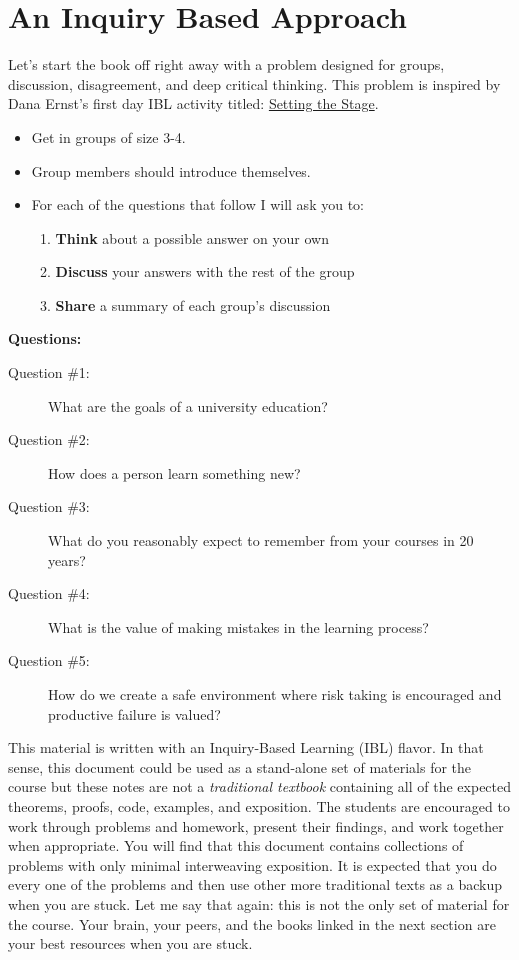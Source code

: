 \section{An Inquiry Based Approach}
\begin{problem}
    Let's start the book off right away with a problem designed for groups, discussion,
    disagreement, and deep critical thinking.  This problem is inspired by Dana Ernst's
    first day IBL activity titled: \href{http://danaernst.com/setting-the-stage/}{Setting
    the Stage}.
    \begin{itemize}
        \item Get in groups of size 3-4.
        \item Group members should introduce themselves.
        \item For each of the questions that follow I will ask you to:
            \begin{enumerate}
                \item {\bf Think} about a possible answer on your own
                \item {\bf Discuss} your answers with the rest of the group
                \item {\bf Share} a summary of each group's discussion
            \end{enumerate}
    \end{itemize}
    {\bf Questions:} 
    \begin{description}
        \item[Question \#1:] What are the goals of a university education?
        \item[Question \#2:] How does a person learn something new?
        \item[Question \#3:] What do you reasonably expect to remember from your courses
            in 20 years?
        \item[Question \#4:] What is the value of making mistakes in the learning process?
        \item[Question \#5:] How do we create a safe environment where risk taking is
            encouraged and productive failure is valued?
    \end{description}
\end{problem}


This material is written with an Inquiry-Based Learning (IBL) flavor. In that sense, this
document could be used as a stand-alone set of materials for the course but these notes
are not a {\it traditional textbook} containing all of the expected theorems, proofs,
code, examples, and exposition. The students are encouraged to work through problems and
homework, present their findings, and work together when appropriate. You will find that
this document contains collections of problems with only minimal interweaving exposition.
It is expected that you do every one of the problems and then use other more traditional
texts as a backup when you are stuck.  Let me say that again: this is not the only set of
material for the course.  Your brain, your peers, and the books linked in the next section
are your best resources when you are stuck.

